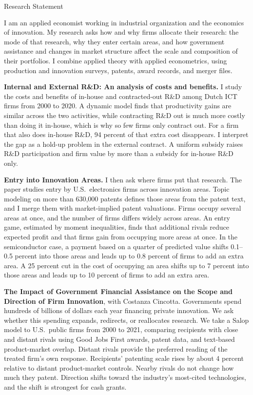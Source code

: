\documentclass[10pt,letterpaper]{article}
\begin{document}
\centerline{\huge Research Statement}
\vspace{0.2in}

I am an applied economist working in industrial organization and the economics of innovation. My research asks how and why firms allocate their research: the mode of that research, why they enter certain areas, and how government assistance and changes in market structure affect the scale and composition of their portfolios. I combine applied theory with applied econometrics, using production and innovation surveys, patents, award records, and merger files.

\textbf{Internal and External R\&D: An analysis of costs and benefits.}
I study the costs and benefits of in-house and contracted-out R\&D among Dutch ICT firms from 2000 to 2020. A dynamic model finds that productivity gains are similar across the two activities, while contracting R\&D out is much more costly than doing it in-house, which is why so few firms only contract out. For a firm that also does in-house R\&D, 94 percent of that extra cost disappears. I interpret the gap as a hold-up problem in the external contract. A uniform subsidy raises R\&D participation and firm value by more than a subsidy for in-house R\&D only.

\textbf{Entry into Innovation Areas.}
I then ask where firms put that research. The paper studies entry by U.S.\ electronics firms across innovation areas. Topic modeling on more than 630,000 patents defines those areas from the patent text, and I merge them with market-implied patent valuations. Firms occupy several areas at once, and the number of firms differs widely across areas. An entry game, estimated by moment inequalities, finds that additional rivals reduce expected profit and that firms gain from occupying more areas at once. In the semiconductor case, a payment based on a quarter of predicted value shifts 0.1--0.5 percent into those areas and leads up to 0.8 percent of firms to add an extra area. A 25 percent cut in the cost of occupying an area shifts up to 7 percent into those areas and leads up to 10 percent of firms to add an extra area.

\textbf{The Impact of Government Financial Assistance on the Scope and Direction of Firm Innovation}, with Costanza Cincotta.
Governments spend hundreds of billions of dollars each year financing private innovation. We ask whether this spending expands, redirects, or reallocates research. We take a Salop model to U.S.\ public firms from 2000 to 2021, comparing recipients with close and distant rivals using Good Jobs First awards, patent data, and text-based product-market overlap. Distant rivals provide the preferred reading of the treated firm's own response. Recipients' patenting scale rises by about 4 percent relative to distant product-market controls. Nearby rivals do not change how much they patent. Direction shifts toward the industry's most-cited technologies, and the shift is strongest for cash grants.
\end{document}
